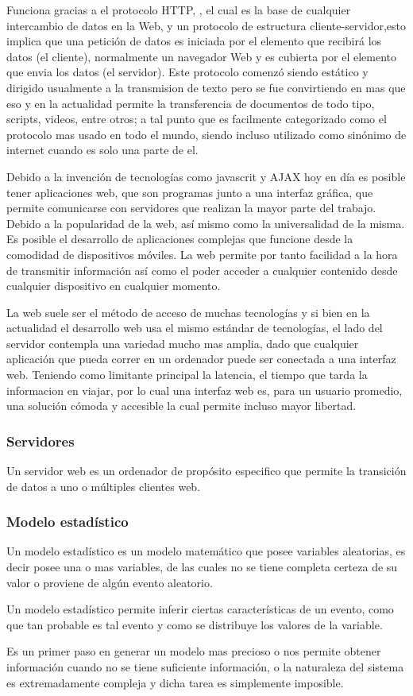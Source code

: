 Funciona gracias a el protocolo HTTP, ,
el cual es la base de cualquier intercambio de datos en la Web, y un protocolo
de estructura cliente-servidor,esto implica que una petición de datos es
iniciada por el elemento que recibirá los datos (el cliente), normalmente un
navegador Web y es cubierta por el elemento que envia los datos (el servidor).
Este protocolo comenzó siendo estático y dirigido usualmente a la transmision de
texto pero se fue convirtiendo en mas que eso y en la actualidad permite la
transferencia de documentos de todo tipo, scripts, videos, entre otros; a tal
punto que es facilmente categorizado como el protocolo mas usado en todo el
mundo, siendo incluso utilizado como sinónimo de internet cuando es solo una
parte de el.

Debido a la invención de tecnologías como javascrit y AJAX hoy en día es
posible tener aplicaciones web, que son programas junto a una interfaz gráfica,
que permite comunicarse con servidores que realizan la mayor parte del trabajo.
Debido a la popularidad de la web, así mismo como la  universalidad de la
misma. Es posible el desarrollo de aplicaciones complejas que funcione desde la
comodidad de dispositivos móviles. La web permite por tanto facilidad a la hora
de transmitir información así como el poder acceder a cualquier contenido desde
cualquier dispositivo en cualquier momento.

La web suele ser el método de acceso de muchas tecnologías y si bien en la actualidad
el desarrollo web usa el mismo estándar de tecnologías, el lado del servidor
contempla una variedad mucho mas amplia, dado que cualquier aplicación que
pueda correr en un ordenador puede ser conectada a una interfaz web. Teniendo
como limitante principal la latencia, el tiempo que tarda la informacion en viajar,
por lo cual una interfaz web es, para un usuario promedio, una solución cómoda y
accesible la cual  permite incluso  mayor libertad.


\subsubsection*{Servidores}

Un servidor web es un ordenador de propósito especifico que permite la
transición de datos a uno o múltiples clientes web.


\subsubsection{Modelo estadístico}

Un modelo estadístico es un modelo matemático que posee variables aleatorias,
es decir posee una o mas variables, de las cuales no se tiene completa certeza
de su valor o proviene de algún evento aleatorio.

Un modelo estadístico permite inferir ciertas características de un evento,
como que tan probable es tal evento y como se distribuye los valores de la
variable.

Es un primer paso en generar un modelo mas precioso o nos permite obtener
información cuando no se tiene suficiente información, o la naturaleza del
sistema es extremadamente compleja y dicha tarea es simplemente imposible.

